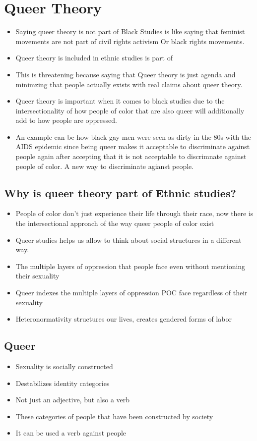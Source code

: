 \documentclass{article}
\begin{document}
\section{Queer Theory}
\begin{itemize}
  \item Saying queer theory is not part of Black Studies is like
    saying that feminist movements are not part of civil rights activism
    Or black rights movements.
  \item Queer theory is included in ethnic studies is part of 
  \item This is threatening because saying that Queer theory is just agenda
    and minimzing that people actually exists with real claims about queer theory.
  \item Queer theory is important when it comes to black studies due to the
    intersectionality of how people of color that are also queer will additionally
    add to how people are oppressed.
  \item An example can be how black gay men were seen as dirty in the 80s with the AIDS epidemic
    since being queer makes it acceptable to discriminate against people again
    after accepting that it is not acceptable to discrimnate against people of color.
    A new way to discriminate agianst people.
\end{itemize}

\subsection{Why is queer theory part of Ethnic studies?}
\begin{itemize}
  \item People of color don't just experience their life through their race,
    now there is the intersectional approach of the way queer people of color exist
  \item Queer studies helps us allow to think about social structures in a different
    way.
  \item The multiple layers of oppression that people face even without mentioning their sexuality
  \item Queer indexes the multiple layers of oppression
    POC face regardless of their sexuality
  \item Heteronormativity structures our lives, creates gendered forms of labor
\end{itemize}

\subsection{Queer}
\begin{itemize}
  \item Sexuality is socially constructed
  \item Destabilizes identity categories
  \item Not just an adjective, but also a verb
  \item These categories of people that have been constructed by society
  \item It can be used a verb against people
\end{itemize}
\end{document}
